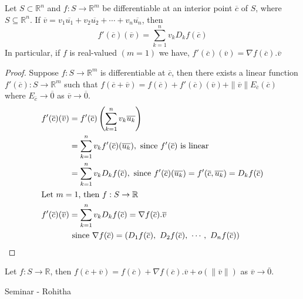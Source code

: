 \begin{theorem}
	Let $S \subset \mathbb{R}^n$ and $f : S \to \mathbb{R}^m$ be differentiable at an interior point $\overline{c}$ of $S$, where $S \subseteq \mathbb{R}^n$. If $\overline{v} = v_1\overline{u_1}+v_2\overline{u_2} + \cdots + v_n\overline{u_n}$, then
	\[ f'(\overline{c})(\overline{v}) = \sum_{k=1}^n v_k D_k f(\overline{c}) \]
	In particular, if $f$ is real-valued $(m = 1)$ we have, $f'(\overline{c})(\overline{v}) = \nabla{}f(\overline{c}).\overline{v}$
\end{theorem}
\begin{proof}
	Suppose $f : S \to \mathbb{R}^m$ is differentiable at $\overline{c}$, then there exists a linear function $f'(\overline{c}) : S \to \mathbb{R}^m$ such that $f(\overline{c}+\overline{v}) = f(\overline{c}) + f'(\overline{c})(\overline{v}) + \|\overline{v}\| E_{\overline{c}}(\overline{c})$ where $E_{\overline{c}} \to \overline{0}$ as $\overline{v} \to \overline{0}$.
	\begin{align*}
		f'(\overline{c})(\overline{v}) & = f'(\overline{c})\left(\sum_{k=1}^n v_k \overline{u_k}\right)\\
			& = \sum_{k=1}^n v_k f'(\overline{c})(\overline{u_k}), \text{ since $f'(\overline{c})$ is linear}\\
			& = \sum_{k=1}^n v_k D_k f(\overline{c}), \text{ since $f'(\overline{c})(\overline{u_k}) = f'(\overline{c},\overline{u_k}) = D_k f(\overline{c})$}\\
		\intertext{Let $m = 1$, then $f : S \to \mathbb{R}$ }
		f'(\overline{c})(\overline{v}) & = \sum_{k=1}^n v_k D_k f(\overline{c}) = \nabla{}f(\overline{c}).\overline{v}\\
		& \text{ since } \nabla{}f(\overline{c}) = \left( D_1f(\overline{c}),\ D_2f(\overline{c}),\ \cdots ,\ D_nf(\overline{c}) \right)
	\end{align*}
\end{proof}

\begin{remark}
	Let $f : S \to \mathbb{R}$, then $f(\overline{c} +\overline{v}) = f (\overline{c}) + \nabla{}f(\overline{c}).\overline{v} + o(\|\overline{v}\|)$ as $\overline{v} \to \overline{0}$.
\end{remark}

\begin{remark}Seminar - Rohitha
\end{remark}

